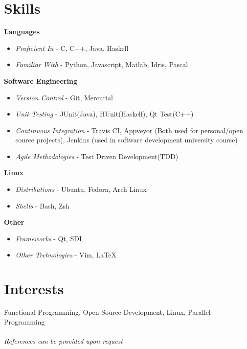 \documentclass[10pt]{article} %
\begin{document}
\section{Skills}
\bf{Languages}
\begin{itemize}
\item \textit{Proficient In} - C, C++, Java, Haskell
\item \textit{Familiar With}  - Python, Javascript, Matlab, Idris, Pascal
\end{itemize}

\bf{Software Engineering}
\begin{itemize}
\item \textit{Version Control} - Git, Mercurial
\item \textit{Unit Testing} - JUnit(Java), HUnit(Haskell), Qt Test(C++)
\item \textit{Continuous Integration} - Travis CI, Appveyor (Both used for personal/open source projects), Jenkins (used in software development university course)
\item \textit{Agile Methodologies} - Test Driven Development(TDD)
\end{itemize}

\bf{Linux}
\begin{itemize}
\item \textit{Distributions} - Ubuntu, Fedora, Arch Linux 
\item \textit{Shells} - Bash, Zsh
\end{itemize}

\bf{Other}
\begin{itemize}
\item \textit{Frameworks} - Qt, SDL
\item \textit{Other Technologies} - Vim, \LaTeX
\end{itemize}


\section{Interests}
Functional Programming, Open Source Development, Linux, Parallel Programming\\\\




\textit{References can be provided upon request}

\end{document}
